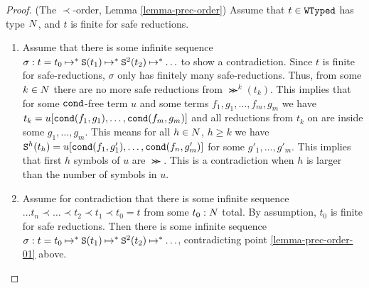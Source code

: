 
\begin{proof}(The $\prec$-order, Lemma \ref{lemma-prec-order})
Assume that $t \in {\tt WTyped}$ has type ${N}$, and $t$ is finite for safe reductions.
\begin{enumerate}
\item 
Assume that there is some infinite sequence 
$\sigma: t = t_0 \mathbin{\mapsto}^{*} {\tt S}(t_1) \mathbin{\mapsto}^{*} {\tt S}^2(t_2) \mathbin{\mapsto}^{*} \ldots$ 
to show a contradiction. Since $t$ is finite for safe-reductions, 
$\sigma$ only has finitely many safe-reductions. 
Thus, from some $k\in{N}$ there are no more safe reductions from
$\Succ^k(t_k)$. This implies that for some ${\tt cond}$-free term 
$u$ and some terms $f_1, g_1, \ldots, f_m, g_m$ we have
$t_k = u[{\tt cond}(f_1,g_1), \ldots, {\tt cond}(f_m,g_m)]$ and all reductions from $t_k$ on are inside
some $g_1, \ldots, g_m$. This means for all $h \in {N}$, $h \ge k$ we  have
${\tt S}^{h}(t_{h}) =  u[{\tt cond}(f_1,g'_1), \ldots, {\tt cond}(f_n,g'_m)]$ for some 
$g'_1, \ldots, g'_m$. This implies that first $h$ symbols of $u$ are $\Succ$.
This is a contradiction when $h$ is larger than 
the number of symbols in $u$.

\item
Assume for contradiction that there is some infinite sequence
$\ldots t_n \prec \ldots \prec t_2 \prec t_1 \prec t_0 = t$
from some $t_0:{N}$ total. By assumption, $t_0$ is finite for safe reductions.
Then there is some infinite sequence 
$\sigma: t = t_0 \mathbin{\mapsto}^{*} {\tt S}(t_1) \mathbin{\mapsto}^{*} {\tt S}^2(t_2) \mathbin{\mapsto}^{*} \ldots$,
contradicting point \ref{lemma-prec-order-01} above.
\end{enumerate}
\end{proof}







